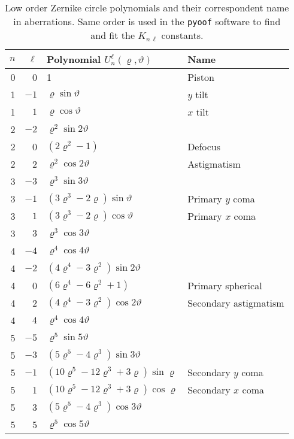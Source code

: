 \documentclass[
    ]
    {aa}
\begin{document}
\begin{appendix}
        \begin{table}[t]
            \caption{Low order Zernike circle polynomials and their correspondent name in aberrations. Same order is used in the \texttt{pyoof} software to find and fit the $K_{n\,\ell}$ constants.}
            \label{tab:zernike_aberration}
            \begin{tabular}{rrll}
                \hline
                \hline
                $n$ & $\ell$ & {Polynomial} $U^\ell_n(\varrho,\vartheta)$ & {Name} \\ \hline
                0 & 0 & 1 & Piston \\
                1 & $-1$ & $\varrho\sin\vartheta$ & $y$ tilt \\
                1 & $1$ & $\varrho\cos\vartheta$ & $x$ tilt \\
                2 & $-2$ & $\varrho^2\sin2\vartheta$ &  \\
                2 & 0 & $(2\varrho^2-1)$ & Defocus \\
                2 & 2 & $\varrho^2\cos2\vartheta$ & Astigmatism \\
                3 & $-3$ & $\varrho^3\sin3\vartheta$ & \\
                3 & $-1$ & $(3\varrho^3-2\varrho)\sin\vartheta$ & Primary $y$ coma \\
                3 & $1$ & $(3\varrho^3-2\varrho)\cos\vartheta$ & Primary $x$ coma \\
                3 & $3$ & $\varrho^3\cos3\vartheta$ & \\
                4 & $-4$ & $\varrho^4\cos4\vartheta $ & \\
                4 & $-2 $ & $(4\varrho^4-3\varrho^2)\sin2\vartheta$ & \\
                4 & 0 & $(6\varrho^4-6\varrho^2+1)$ & Primary spherical \\
                4 & 2 & $(4\varrho^4-3\varrho^2)\cos2\vartheta$ & Secondary astigmatism \\
                4 & $4$ & $\varrho^4\cos4\vartheta $ & \\
                5 & $-5$ & $\varrho^5\sin5\vartheta$ & \\
                5 & $-3$ & $(5\varrho^5-4\varrho^3)\sin3\vartheta$ & \\
                5 & $-1$ & $(10\varrho^5-12\varrho^3+3\varrho)\sin\varrho$ & Secondary $y$ coma \\
                5 & 1 & $(10\varrho^5-12\varrho^3+3\varrho)\cos\varrho$ & Secondary $x$ coma \\
                5 & 3 & $(5\varrho^5-4\varrho^3)\cos3\vartheta$ & \\
                5 & 5 & $\varrho^5\cos5\vartheta$ & \\
                \hline
            \end{tabular}
        \end{table}


\end{appendix}
\end{document}
